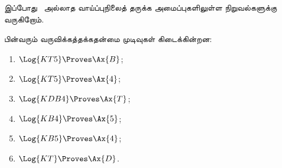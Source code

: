 \documentclass[../../../include/open-logic-section]{subfiles}
\begin{document}


இப்போது~ அல்லாத வாய்ப்புநிலைத் தருக்க அமைப்புகளிலுள்ள நிறுவல்களுக்கு
வருகிறோம்.

\begin{prop}
பின்வரும் வருவிக்கத்தக்கதன்மை முடிவுகள் கிடைக்கின்றன:
  \begin{enumerate}
  \item $\Log{KT5} \Proves \Ax{B}$;
  \item $\Log{KT5} \Proves \Ax{4}$;
  \item $\Log{KDB4} \Proves \Ax{T}$;
  \item $\Log{KB4} \Proves \Ax{5}$;
  \item $\Log{KB5} \Proves \Ax{4}$;
  \item {}$\Log{KT} \Proves \Ax{D}$.
  \end{enumerate}
\end{prop}
\end{document}

